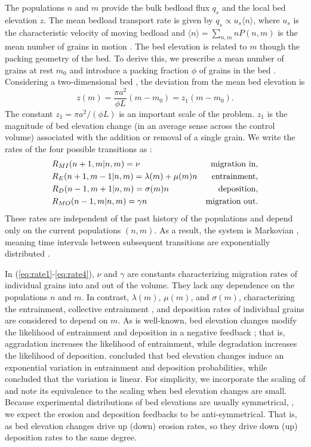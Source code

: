\documentclass[draft]{agujournal2018}
\newcommand\be{\begin{equation}} %
\newcommand\ee{\end{equation}}   %
\newcommand\bra{\langle}
\newcommand\ket{\rangle}
\begin{document}
The populations $n$ and $m$ provide the bulk bedload flux $q_s$ and the local bed elevation $z$.
The mean bedload transport rate is given by $q_s \propto u_s \bra n \ket$, where $u_s$ is the characteristic velocity of moving bedload and $\bra n \ket = 
\sum_{n,m}nP(n,m) $ is the mean number of grains in motion \citep[e.g.][]{Charru2004, Ancey2008, Furbish2012a}.
The bed elevation is related to $m$ though the packing geometry of the bed.
To derive this, we prescribe a mean number of grains at rest $m_0$ and introduce a packing fraction $\phi$ of grains in the bed \citep[e.g.][]{Coleman2009}.
Considering a two-dimensional bed \citep[e.g.][]{Einstein1950, Paintal1971}, the deviation from the mean bed elevation is
\be z(m) = \frac{\pi a^2}{\phi L}(m-m_0) = z_1(m-m_0). \label{eq:ele}\ee
The constant $z_1 = \pi a^2/(\phi L)$ is an important scale of the problem. 
$z_1$ is the magnitude of bed elevation change (in an average sense across the control volume) associated with the addition or removal of a single grain.
We write the rates of the four possible transitions as \citep[e.g.][]{Ancey2008}:
\begin{align}
 &R_{MI}(n+1,m|n,m) = \nu & \text{migration in}, \label{eq:rate1}\\
 &R_E(n+1,m-1|n,m) =\lambda(m) + \mu(m) n  & \text{entrainment},  \label{eq:rate2}\\
 &R_D(n-1,m+1|n,m) =\sigma(m) n & \text{deposition},\label{eq:rate3}\\
 &R_{MO}(n-1,m|n,m) =\gamma n & \text{migration out\label{eq:rate4}}.
\end{align}
These rates are independent of the past history of the populations and depend only on the current populations $(n,m)$. 
As a result, the system is Markovian \citep[e.g.][]{Cox1965, VanKampen1992}, meaning time intervals between subsequent transitions are exponentially distributed \citep[e.g.][]{Gillespie2007}.

In (\ref{eq:rate1}-\ref{eq:rate4}), $\nu$ and $\gamma$ are constants characterizing migration rates of individual grains into and out of the volume. 
They lack any dependence on the populations $n$ and $m$.
In contrast, $\lambda(m)$, $\mu(m)$, and $\sigma(m)$, characterizing the entrainment, collective entrainment \citep[e.g.][]{Ancey2008, Heyman2013, Heyman2014}, and deposition rates of individual grains are considered to depend on $m$.
As is well-known, bed elevation changes modify the likelihood of entrainment and deposition in a negative feedback \citep{Sawai1987, Wong2007}; that is, aggradation increases the likelihood of entrainment, while degradation increases the likelihood of deposition.
\citet{Wong2007} concluded that bed elevation changes induce an exponential variation in entrainment and deposition probabilities, while \citet{Sawai1987} concluded that the variation is linear.
For simplicity, we incorporate the scaling of \citet{Sawai1987} and note its equivalence to the \citet{Wong2007} scaling when bed elevation changes are small.
Because experimental distributions of bed elevations are usually symmetrical, \citep{Wong2007, Singh2009, Martin2014}, we expect the erosion and deposition feedbacks to be anti-symmetrical.
That is, as bed elevation changes drive up (down) erosion rates, so they drive down (up) deposition rates to the same degree.
\end{document}
